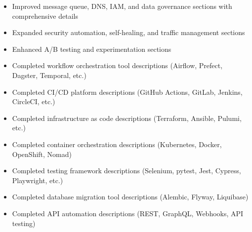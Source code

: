 \documentclass[11pt,a4paper]{article}
\begin{document}
\begin{itemize}
\item Improved message queue, DNS, IAM, and data governance sections with comprehensive details
\end{itemize}

\begin{itemize}
\item Expanded security automation, self-healing, and traffic management sections
\end{itemize}

\begin{itemize}
\item Enhanced A/B testing and experimentation sections
\end{itemize}

\begin{itemize}
\item Completed workflow orchestration tool descriptions (Airflow, Prefect, Dagster, Temporal, etc.)
\end{itemize}

\begin{itemize}
\item Completed CI/CD platform descriptions (GitHub Actions, GitLab, Jenkins, CircleCI, etc.)
\end{itemize}

\begin{itemize}
\item Completed infrastructure as code descriptions (Terraform, Ansible, Pulumi, etc.)
\end{itemize}

\begin{itemize}
\item Completed container orchestration descriptions (Kubernetes, Docker, OpenShift, Nomad)
\end{itemize}

\begin{itemize}
\item Completed testing framework descriptions (Selenium, pytest, Jest, Cypress, Playwright, etc.)
\end{itemize}

\begin{itemize}
\item Completed database migration tool descriptions (Alembic, Flyway, Liquibase)
\end{itemize}

\begin{itemize}
\item Completed API automation descriptions (REST, GraphQL, Webhooks, API testing)
\end{itemize}
\end{document}
